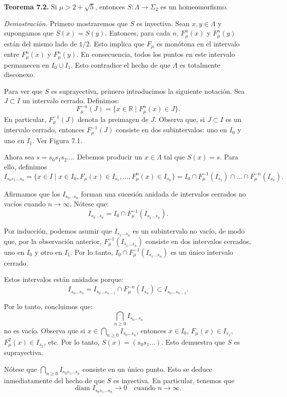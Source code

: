 \documentclass[10pt,a4paper]{book}
\begin{document}
\textbf{Teorema 7.2.} Si $\mu > 2 + \sqrt{5}$, entonces $S : \Lambda \to \Sigma_2$ es un homeomorfismo.

\textit{Demostración.} Primero mostraremos que $S$ es inyectiva. Sean $x, y \in \Lambda$ y supongamos que $S(x) = S(y)$. Entonces, para cada $n$, $F_\mu^n(x)$ y $F_\mu^n(y)$ están del mismo lado de $1/2$. Esto implica que $F_\mu$ es monótona en el intervalo entre $F_\mu^n(x)$ y $F_\mu^n(y)$. En consecuencia, todos los puntos en este intervalo permanecen en $I_0 \cup I_1$. Esto contradice el hecho de que $\Lambda$ es totalmente disconexo.

Para ver que $S$ es suprayectiva, primero introducimos la siguiente notación. Sea $J \subset I$ un intervalo cerrado. Definimos:
\[
F_\mu^{-n}(J) = \{x \in \mathbb{R} \mid F_\mu^n(x) \in J\}.
\]
En particular, $F_\mu^{-1}(J)$ denota la preimagen de $J$. Observa que, si $J \subset I$ es un intervalo cerrado, entonces $F_\mu^{-1}(J)$ consiste en dos subintervalos: uno en $I_0$ y uno en $I_1$. Ver Figura 7.1.

Ahora sea $s = s_0 s_1 s_2 \dots$. Debemos producir un $x \in \Lambda$ tal que $S(x) = s$. Para ello, definimos
\[
I_{s_0 s_1 \dots s_n} = \{x \in I \mid x \in I_0, F_\mu(x) \in I_{s_1}, \dots, F_\mu^n(x) \in I_{s_n}\} = I_0 \cap F_\mu^{-1}(I_{s_1}) \cap \dots \cap F_\mu^{-n}(I_{s_n}).
\]

Afirmamos que los $I_{s_0 \dots s_n}$ forman una sucesión anidada de intervalos cerrados no vacíos cuando $n \to \infty$. Nótese que:
\[
I_{s_0 \dots s_n} = I_0 \cap F_\mu^{-1}(I_{s_1 \dots s_n}).
\]

Por inducción, podemos asumir que $I_{s_1 \dots s_n}$ es un subintervalo no vacío, de modo que, por la observación anterior, $F_\mu^{-1}(I_{s_1 \dots s_n})$ consiste en dos intervalos cerrados, uno en $I_0$ y otro en $I_1$. Por lo tanto, $I_0 \cap F_\mu^{-1}(I_{s_1 \dots s_n})$ es un único intervalo cerrado.

Estos intervalos están anidados porque:
\[
I_{s_0 \dots s_n} = I_{s_0 \dots s_{n-1}} \cap F_\mu^{-n}(I_{s_n}) \subset I_{s_0 \dots s_{n-1}}.
\]

Por lo tanto, concluimos que:
\[
\bigcap_{n \geq 0} I_{s_0 \dots s_n}
\]
no es vacío. Observa que si $x \in \bigcap_{n \geq 0} I_{s_0 \dots s_n}$, entonces $x \in I_0$, $F_\mu(x) \in I_{s_1}$, $F_\mu^2(x) \in I_{s_2}$, etc. Por lo tanto, $S(x) = (s_0 s_1 \dots)$. Esto demuestra que $S$ es suprayectiva.

Nótese que $\bigcap_{n \geq 0} I_{s_0 s_1 \dots s_n}$ consiste en un único punto. Esto se deduce inmediatamente del hecho de que $S$ es inyectiva. En particular, tenemos que
\[
\text{diam } I_{s_0 s_1 \dots s_n} \to 0 \quad \text{cuando } n \to \infty.
\]
\end{document}
